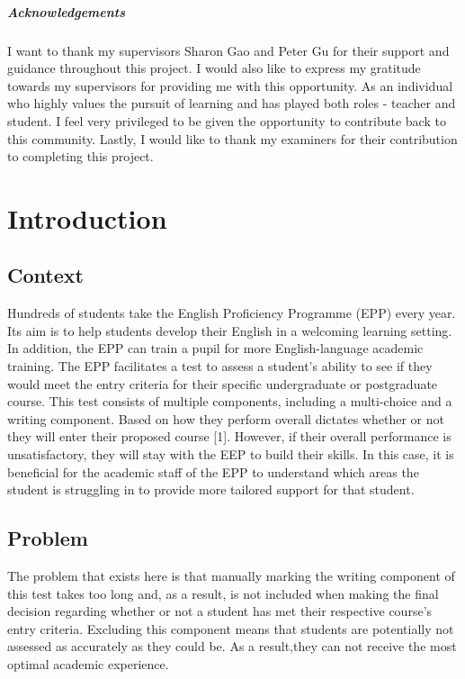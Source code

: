 \paragraph{Acknowledgements}
I want to thank my supervisors Sharon Gao and Peter Gu for their support and guidance throughout this project. I would also like to express my gratitude towards my supervisors for providing me with this opportunity. As an individual who highly values the pursuit of learning and has played both roles - teacher and student. I feel very privileged to be given the opportunity to contribute back to this community. Lastly, I would like to thank my examiners for their contribution to completing this project.

\backmatter

\chapter{Introduction}\label{C:intro}

\section{Context}

Hundreds of students take the English Proficiency Programme (EPP) every year. Its aim is to help students develop their English in a welcoming learning setting. In addition, the EPP can train a pupil for more English-language academic training. The EPP facilitates a test to assess a student's ability to see if they would meet the entry criteria for their specific undergraduate or postgraduate course. This test consists of multiple components, including a multi-choice and a writing component. Based on how they perform overall dictates whether or not they will enter their proposed course [1]. However, if their overall performance is unsatisfactory, they will stay with the EEP to build their skills. In this case, it is beneficial for the academic staff of the EPP to understand which areas the student is struggling in to provide more tailored support for that student. 

\section{Problem}

The problem that exists here is that manually marking the writing component of this test takes too long and, as a result, is not included when making the final decision regarding whether or not a student has met their respective course's entry criteria. Excluding this component means that students are potentially not assessed as accurately as they could be. As a result,they can not receive the most optimal academic experience.

